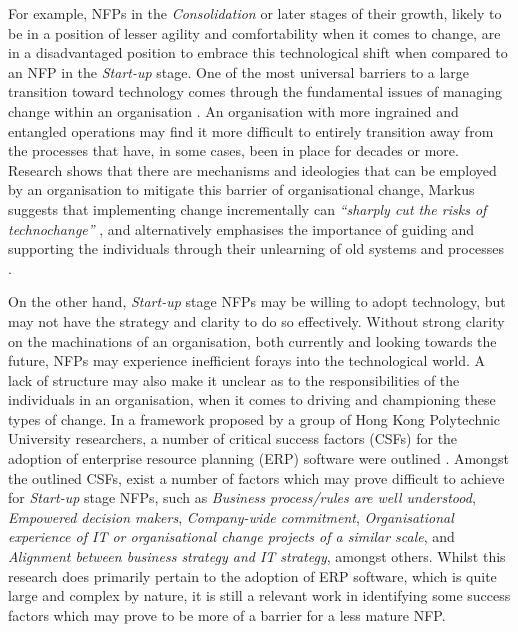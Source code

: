 For example, NFPs in the \emph{Consolidation} or later stages of their growth, likely to be in a position of lesser agility and comfortability when it comes to change, are in a disadvantaged position to embrace this technological shift when compared to an NFP in the \emph{Start-up} stage. One of the most universal barriers to a large transition toward technology comes through the fundamental issues of managing change within an organisation \cite{o2007towards} \cite{schein1994management}. An organisation with more ingrained and entangled operations may find it more difficult to entirely transition away from the processes that have, in some cases, been in place for decades or more. Research shows that there are mechanisms and ideologies that can be employed by an organisation to mitigate this barrier of organisational change, Markus suggests that implementing change incrementally can \emph{“sharply cut the risks of technochange”} \cite[p.~18]{markus2004technochange}, and alternatively emphasises the importance of guiding and supporting the individuals through their unlearning of old systems and processes \cite{becker2010facilitating}.

On the other hand, \emph{Start-up} stage NFPs may be willing to adopt technology, but may not have the strategy and clarity to do so effectively. Without strong clarity on the machinations of an organisation, both currently and looking towards the future, NFPs may experience inefficient forays into the technological world. A lack of structure may also make it unclear as to the responsibilities of the individuals in an organisation, when it comes to driving and championing these types of change. In a framework proposed by a group of Hong Kong Polytechnic University researchers, a number of critical success factors (CSFs) for the adoption of enterprise resource planning (ERP) software were outlined \cite{ngai2008examining}. Amongst the outlined CSFs, exist a number of factors which may prove difficult to achieve for \emph{Start-up} stage NFPs, such as \emph{Business process/rules are well understood}, \emph{Empowered decision makers}, \emph{Company-wide commitment}, \emph{Organisational experience of IT or organisational change projects of a similar scale}, and \emph{Alignment between business strategy and IT strategy}, amongst others. Whilst this research does primarily pertain to the adoption of ERP software, which is quite large and complex by nature, it is still a relevant work in identifying some success factors which may prove to be more of a barrier for a less mature NFP.

